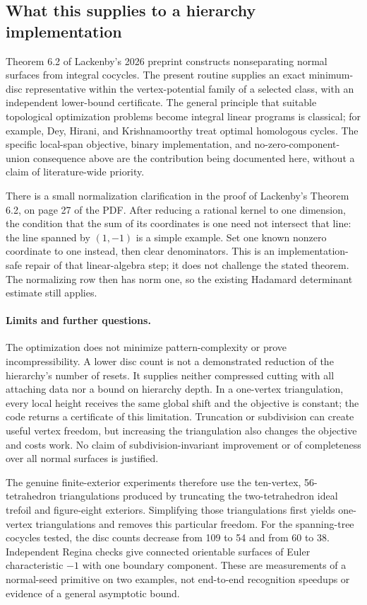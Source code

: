 \subsection{What this supplies to a hierarchy implementation}

Theorem 6.2 of Lackenby's 2026 preprint \cite{lackenby2026} constructs nonseparating normal
surfaces from integral cocycles. The present routine supplies an exact
minimum-disc representative within the vertex-potential family of a
selected class, with an independent lower-bound certificate. The general
principle that suitable topological optimization problems become integral
linear programs is classical; for example, Dey, Hirani, and Krishnamoorthy
\cite{dey2011} treat optimal homologous cycles. The specific local-span objective, binary implementation,
and no-zero-component-union consequence above are the contribution being
documented here, without a claim of literature-wide priority.

There is a small normalization clarification in the proof of Lackenby's
Theorem 6.2, on page 27 of the PDF. After reducing a rational kernel to
one dimension, the condition that the sum of its coordinates is one need
not intersect that line: the line spanned by $(1,-1)$ is a simple example.
Set one known nonzero coordinate to one instead, then clear denominators.
This is an implementation-safe repair of that linear-algebra step; it
does not challenge the stated theorem. The normalizing row then has norm
one, so the existing Hadamard determinant estimate still applies.

\paragraph{Limits and further questions.}
The optimization does not minimize pattern-complexity or prove
incompressibility. A lower disc count is not a demonstrated reduction of
the hierarchy's number of resets. It supplies neither compressed cutting
with all attaching data nor a bound on hierarchy depth. In a one-vertex
triangulation, every local height receives the same global shift and the
objective is constant; the code returns a certificate of this limitation.
Truncation or subdivision can create useful vertex freedom, but increasing
the triangulation also changes the objective and costs work. No claim of
subdivision-invariant improvement or of completeness over all normal
surfaces is justified.

The genuine finite-exterior experiments therefore use the ten-vertex,
56-tetrahedron triangulations produced by truncating the two-tetrahedron
ideal trefoil and figure-eight exteriors. Simplifying those triangulations
first yields one-vertex triangulations and removes this particular freedom.
For the spanning-tree cocycles tested, the disc counts decrease from
109 to 54 and from 60 to 38. Independent Regina checks give connected
orientable surfaces of Euler characteristic $-1$ with one boundary
component. These are measurements of a normal-seed primitive on two
examples, not end-to-end recognition speedups or evidence of a general
asymptotic bound.

